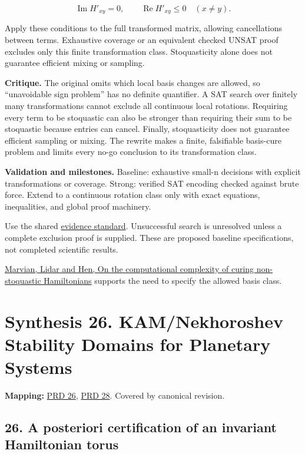 \documentclass[
  11pt,
]{article}
\begin{document}
\[\operatorname{Im}H'_{xy}=0,\qquad\operatorname{Re}H'_{xy}\le0\quad(x\ne y).\]

Apply these conditions to the full transformed matrix, allowing
cancellations between terms. Exhaustive coverage or an equivalent
checked UNSAT proof excludes only this finite transformation class.
Stoquasticity alone does not guarantee efficient mixing or sampling.

\textbf{Critique.} The original omits which local basis changes are
allowed, so ``unavoidable sign problem'' has no definite quantifier. A
SAT search over finitely many transformations cannot exclude all
continuous local rotations. Requiring every term to be stoquastic can
also be stronger than requiring their sum to be stoquastic because
entries can cancel. Finally, stoquasticity does not guarantee efficient
sampling or mixing. The rewrite makes a finite, falsifiable basis-cure
problem and limits every no-go conclusion to its transformation class.

\textbf{Validation and milestones.} Baseline: exhaustive small-n
decisions with explicit transformations or coverage. Strong: verified
SAT encoding checked against brute force. Extend to a continuous
rotation class only with exact equations, inequalities, and global proof
machinery.

Use the shared
\href{https://github.com/rick-stevens-ai/Pure-Thought/blob/main/reviews/EVIDENCE-STANDARD.md}{evidence
standard}. Unsuccessful search is unresolved unless a complete exclusion
proof is supplied. These are proposed baseline specifications, not
completed scientific results.

\href{https://pmc.ncbi.nlm.nih.gov/articles/PMC6450938/}{Marvian, Lidar
and Hen, On the computational complexity of curing non-stoquastic
Hamiltonians} supports the need to specify the allowed basis class.

\section{Synthesis 26. KAM/Nekhoroshev Stability Domains for Planetary
Systems}

\textbf{Mapping:}
\href{https://github.com/rick-stevens-ai/Pure-Thought/blob/main/PRDs/26-KAM-Theory-Planetary-Stability.md}{PRD
26},
\href{https://github.com/rick-stevens-ai/Pure-Thought/blob/main/PRDs/28-Nekhoroshev-Stability-Theory.md}{PRD
28}. Covered by canonical revision.

\subsection{26. A posteriori certification of an invariant Hamiltonian
torus}
\end{document}
